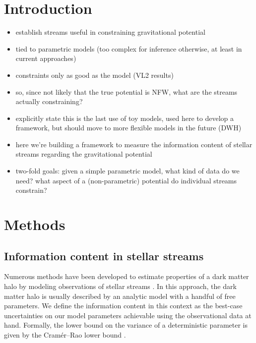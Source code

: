 \documentclass[modern]{aastex61}
\newcommand{\acronym}[1]{{\small{#1}}}
\newcommand{\CRLB}{\acronym{CRLB}}
\begin{document}

\section{Introduction} \label{sec:intro}

\begin{itemize}
 \item establish streams useful in constraining gravitational potential
 \item tied to parametric models (too complex for inference otherwise, at least in current approaches)
 \item constraints only as good as the model (VL2 results)
 \item so, since not likely that the true potential is NFW, what are the streams actually constraining? 
 \item explicitly state this is the last use of toy models, used here to develop a framework, but should move to more flexible models in the future (DWH)
 \item here we're building a framework to measure the information content of stellar streams regarding the gravitational potential
 \item two-fold goals: given a simple parametric model, what kind of data do we need? what aspect of a (non-parametric) potential do individual streams constrain?
\end{itemize}


\section{Methods}
\label{sec:method}

\subsection{Information content in stellar streams}
Numerous methods have been developed to estimate properties of a dark matter halo by modeling observations of stellar streams \citep[e.g.,][]{}.
In this approach, the dark matter halo is usually described by an analytic model with a handful of free parameters.
We define the information content in this context as the best-case uncertainties on our model parameters achievable using the observational data at hand.
Formally, the lower bound on the variance of a deterministic parameter is given by the Cram\' er--Rao lower bound \citep[\CRLB,][]{Cramer1946, Rao1945}.
\end{document}
